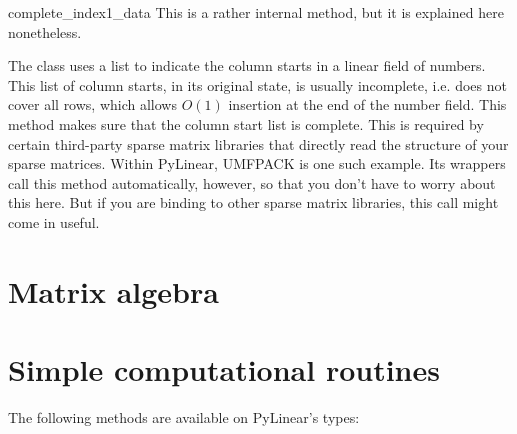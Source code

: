\begin{methoddesc}[SparseExecuteMatrix]{complete_index1_data}{}
  This is a rather internal method, but it is explained here
  nonetheless.

  The  class uses a list to indicate the
  column starts in a linear field of numbers. This list of column
  starts, in its original state, is usually incomplete, i.e. does not
  cover all rows, which allows $O(1)$ insertion at the end of the
  number field. This method makes sure that the column start list is
  complete. This is required by certain third-party sparse matrix
  libraries that directly read the structure of your sparse
  matrices. Within PyLinear, UMFPACK is one such example. Its wrappers
  call this method automatically, however, so that you don't have to
  worry about this here. But if you are binding to other sparse matrix
  libraries, this call might come in useful.
\end{methoddesc}
\section{Matrix algebra}




\section{Simple computational routines}

The following methods are available on PyLinear's  types:

